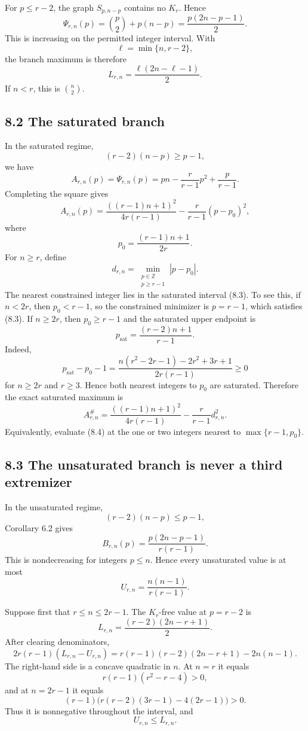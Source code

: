 \documentclass[11pt,a4paper]{article}
\begin{document}
For \(p\le r-2\), the graph \(S_{p,n-p}\) contains no \(K_r\). Hence
\[
\Psi_{r,n}(p)
=
\binom p2+p(n-p)
=
\frac{p(2n-p-1)}2.
\tag{8.1}
\]
This is increasing on the permitted integer interval. With
\[
\ell=\min\{n,r-2\},
\]
the branch maximum is therefore
\[
\boxed{
L_{r,n}=\frac{\ell(2n-\ell-1)}2.
}
\tag{8.2}
\]
If \(n<r\), this is \(\binom n2\).

\subsection{8.2 The saturated branch}\label{the-saturated-branch}

In the saturated regime,
\[
(r-2)(n-p)\ge p-1,
\tag{8.3}
\]
we have
\[
A_{r,n}(p)
=
\Psi_{r,n}(p)
=
pn-\frac r{r-1}p^2+\frac p{r-1}.
\tag{8.4}
\]
Completing the square gives
\[
A_{r,n}(p)
=
\frac{((r-1)n+1)^2}{4r(r-1)}
-
\frac r{r-1}(p-p_0)^2,
\tag{8.5}
\]
where
\[
p_0=\frac{(r-1)n+1}{2r}.
\tag{8.6}
\]
For \(n\ge r\), define
\[
d_{r,n}
=
\min_{\substack{p\in\mathbb Z\\p\ge r-1}}|p-p_0|.
\tag{8.7}
\]
The nearest constrained integer lies in the saturated interval (8.3). To
see this, if \(n<2r\), then \(p_0<r-1\), so the constrained minimizer is
\(p=r-1\), which satisfies (8.3). If \(n\ge2r\), then \(p_0\ge r-1\)
and the saturated upper endpoint is
\[
p_{\mathrm{sat}}=\frac{(r-2)n+1}{r-1}.
\]
Indeed,
\[
p_{\mathrm{sat}}-p_0-1
=
\frac{n(r^2-2r-1)-2r^2+3r+1}{2r(r-1)}
\ge0
\]
for \(n\ge2r\) and \(r\ge3\). Hence both nearest integers to \(p_0\)
are saturated. Therefore the exact saturated maximum is
\[
\boxed{
A_{r,n}^{\#}
=
\frac{((r-1)n+1)^2}{4r(r-1)}
-
\frac r{r-1}d_{r,n}^2.
}
\tag{8.8}
\]
Equivalently, evaluate (8.4) at the one or two integers nearest to
\(\max\{r-1,p_0\}\).

\subsection{8.3 The unsaturated branch is never a third extremizer}\label{the-unsaturated-branch-is-never-a-third-extremizer}

In the unsaturated regime,
\[
(r-2)(n-p)\le p-1,
\]
Corollary 6.2 gives
\[
B_{r,n}(p)
=
\frac{p(2n-p-1)}{r(r-1)}.
\tag{8.9}
\]
This is nondecreasing for integers \(p\le n\). Hence every unsaturated value
is at most
\[
U_{r,n}=\frac{n(n-1)}{r(r-1)}.
\tag{8.10}
\]

Suppose first that \(r\le n\le2r-1\). The \(K_r\)-free value at \(p=r-2\)
is
\[
L_{r,n}=\frac{(r-2)(2n-r+1)}2.
\]
After clearing denominators,
\[
2r(r-1)(L_{r,n}-U_{r,n})
=
r(r-1)(r-2)(2n-r+1)-2n(n-1).
\tag{8.11}
\]
The right-hand side is a concave quadratic in \(n\). At \(n=r\) it
equals
\[
r(r-1)(r^2-r-4)>0,
\]
and at \(n=2r-1\) it equals
\[
(r-1)\bigl(r(r-2)(3r-1)-4(2r-1)\bigr)>0.
\]
Thus it is nonnegative throughout the interval, and
\[
U_{r,n}\le L_{r,n}.
\tag{8.12}
\]
\end{document}
